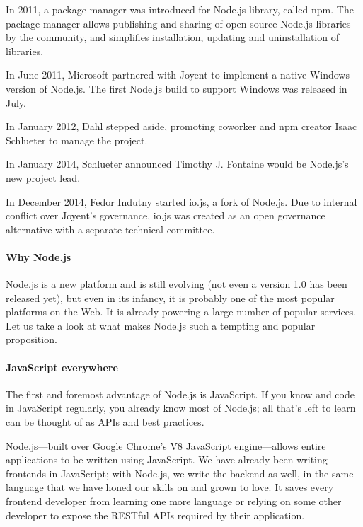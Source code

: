 In 2011, a package manager was introduced for Node.js library, called npm. The package manager allows publishing and sharing of open-source Node.js libraries by the community, and simplifies installation, updating and uninstallation of libraries.\cite{18}

In June 2011, Microsoft partnered with Joyent to implement a native Windows version of Node.js. The first Node.js build to support Windows was released in July.\cite{18}

In January 2012, Dahl stepped aside, promoting coworker and npm creator Isaac Schlueter to manage the project.\cite{18}

In January 2014, Schlueter announced Timothy J. Fontaine would be Node.js's new project lead.\cite{18}

In December 2014, Fedor Indutny started io.js, a fork of Node.js. Due to internal conflict over Joyent's governance, io.js was created as an open governance alternative with a separate technical committee.\cite{18}

\paragraph*{Why Node.js}
\hfill \break
Node.js is a new platform and is still evolving (not even a version 1.0 has been
released yet), but even in its infancy, it is probably one of the most popular platforms
on the Web. It is already powering a large number of popular services. Let us take a
look at what makes Node.js such a tempting and popular proposition.\cite{16}

\paragraph*{JavaScript everywhere}
\hfill \break
The first and foremost advantage of Node.js is JavaScript. If you know and code in
JavaScript regularly, you already know most of Node.js; all that's left to learn can be
thought of as APIs and best practices.\cite{16}

Node.js—built over Google Chrome's V8 JavaScript engine—allows entire
applications to be written using JavaScript. We have already been writing frontends
in JavaScript; with Node.js, we write the backend as well, in the same language that
we have honed our skills on and grown to love. It saves every frontend developer
from learning one more language or relying on some other developer to expose the
RESTful APIs required by their application.\cite{16}

